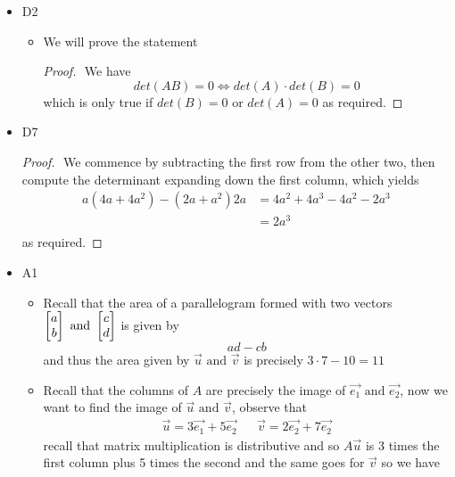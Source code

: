 \documentclass[11pt]{book}
\begin{document}
\begin{itemize}
\begin{itemize}
        \end{itemize}
    \item D2
        \begin{itemize}
            \item We will prove the statement 
                \begin{proof}
                $ $\newline
                    We have 
                    \[
                    \mathit{det} \left(AB\right) = 0 \Leftrightarrow \mathit{det} \left(A\right)  \cdot \mathit{det} \left(B\right) = 0
                    \]
                    which is only true if $\mathit{det} \left(B\right) = 0$ or $\mathit{det} \left(A\right) = 0$ as required.
                \end{proof}
        \end{itemize}
    \item D7
        \begin{proof}
        $ $\newline
        We commence by subtracting the first row from the other two, then compute the determinant expanding down the first column, which yields 
        \begin{align*}
            a\left( 4a + 4a^2  \right)  - \left( 2a  + a^2  \right) 2a &=  4a^2  + 4a^3  - 4a^2  - 2a^3\\ 
            &= 2a^3    \\ 
        \end{align*}
        as required.
        \end{proof}
    \item A1
        \begin{itemize}
            \item Recall that the area of a parallelogram formed with two vectors $\begin{bmatrix} a \\ b \end{bmatrix} \text{ and } \begin{bmatrix} c \\ d \end{bmatrix} $ is given by 
        \[
        ad - cb
        \]
        and thus the area given by $\vec{u} \text{ and } \vec{v} $ is precisely $3 \cdot 7 - 10= 11$ 
            \item Recall that the columns of $A$  are precisely the image of $\vec{e_1} \text{ and } \vec{e_2} $, now we want to find the image of $\vec{u} \text{ and } \vec{v} $, observe that 
                \begin{align*}
                    \vec{u} = 3\vec{e_1}  + 5\vec{e_2}  && \vec{v} = 2\vec{e_2}  + 7\vec{e_2} 
                \end{align*}
                recall that matrix multiplication is distributive and so $A\vec{u} $ is 3 times the first column plus 5 times the second and the same goes for $\vec{v} $ so we have 

\end{itemize}
\end{itemize}
\end{document}
